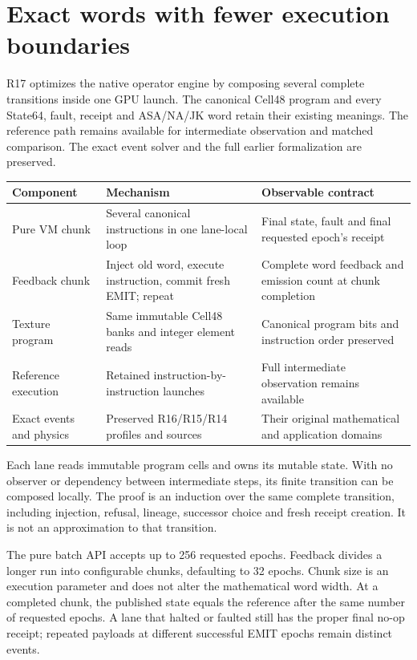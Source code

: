 \section*{Exact words with fewer execution boundaries}
R17 optimizes the native operator engine by composing several complete
transitions inside one GPU launch. The canonical Cell48 program and every
State64, fault, receipt and ASA/NA/JK word retain their existing meanings.
The reference path remains available for intermediate observation and matched
comparison. The exact event solver and the full earlier formalization are
preserved.

\begin{center}\small
\begin{tabularx}{\linewidth}{@{}P{33mm}Y Y@{}}
\toprule Component & Mechanism & Observable contract\\\midrule
Pure VM chunk & Several canonical instructions in one lane-local loop & Final state, fault and final requested epoch's receipt\\
Feedback chunk & Inject old word, execute instruction, commit fresh EMIT; repeat & Complete word feedback and emission count at chunk completion\\
Texture program & Same immutable Cell48 banks and integer element reads & Canonical program bits and instruction order preserved\\
Reference execution & Retained instruction-by-instruction launches & Full intermediate observation remains available\\
Exact events and physics & Preserved R16/R15/R14 profiles and sources & Their original mathematical and application domains\\
\bottomrule
\end{tabularx}\end{center}

Each lane reads immutable program cells and owns its mutable state. With no
observer or dependency between intermediate steps, its finite transition can
be composed locally. The proof is an induction over the same complete
transition, including injection, refusal, lineage, successor choice and fresh
receipt creation. It is not an approximation to that transition.

The pure batch API accepts up to 256 requested epochs. Feedback divides a
longer run into configurable chunks, defaulting to 32 epochs. Chunk size is
an execution parameter and does not alter the mathematical word width.
At a completed chunk, the published state equals the reference after the same
number of requested epochs. A lane that halted or faulted still has the proper
final no-op receipt; repeated payloads at different successful EMIT epochs
remain distinct events.

